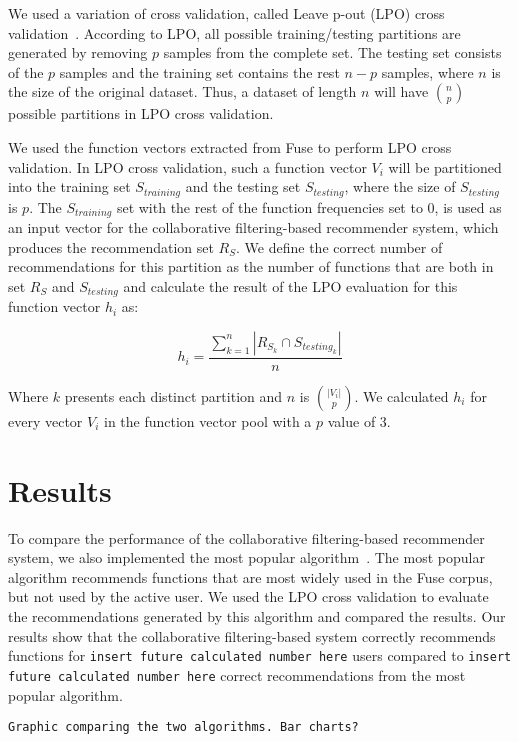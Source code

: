 \documentclass[conference]{IEEEtran}
\begin{document}
We used a variation of cross validation, called Leave p-out (LPO) cross validation~\cite{arlot2010survey}. According to LPO, all possible training/testing partitions are generated by removing $p$ samples from the complete set. The testing set consists of the $p$ samples and the training set contains the rest $n-p$ samples, where $n$ is the size of the original dataset. Thus, a dataset of length $n$ will have $n \choose p$ possible partitions in LPO cross validation.

We used the function vectors extracted from Fuse to perform LPO cross validation. In LPO cross validation, such a function vector $V_i$ will be partitioned into the training set $S_{training}$ and the testing set $S_{testing}$, where the size of $S_{testing}$ is $p$. The $S_{training}$ set with the rest of the function frequencies set to 0, is used as an input vector for the collaborative filtering-based recommender system, which produces the recommendation set $R_S$. We define the correct number of recommendations for this partition as the number of functions that are both in set $R_S$ and $S_{testing}$ and calculate the result of the LPO evaluation for this function vector $h_i$ as:

\begin{center}
	\[
	h_i = \frac{\sum\limits_{k=1}^{n} |R_{S_k} \cap S_{{testing}_k}|}{n}
	\]
\end{center}

Where $k$ presents each distinct partition and $n$ is $|V_i|\choose p$. We calculated $h_i$ for every vector $V_i$ in the function vector pool with a $p$ value of 3.

\section{Results}
To compare the performance of the collaborative filtering-based recommender system, we also implemented the most popular algorithm~\cite{linton2000owl}. The most popular algorithm recommends functions that are most widely used in the Fuse corpus, but not used by the active user. We used the LPO cross validation to evaluate the recommendations generated by this algorithm and compared the results. Our results show that the collaborative filtering-based system correctly recommends functions for \texttt{insert future calculated number here}  users compared to \texttt{insert future calculated number here} correct recommendations from the most popular algorithm.

\texttt{Graphic comparing the two algorithms. Bar charts?}
\end{document}
